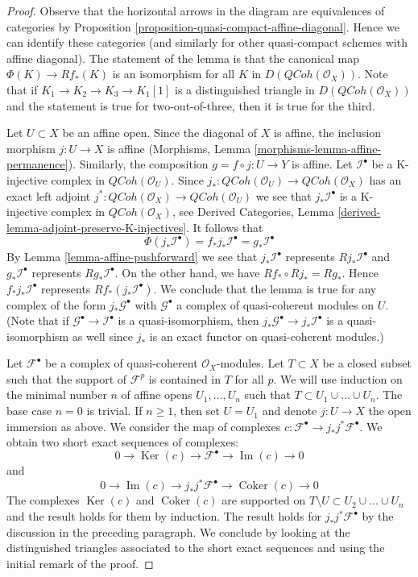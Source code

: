 \documentclass{stacks-project}
\theoremstyle{plain}
\theoremstyle{definition}
\theoremstyle{remark}
\numberwithin{equation}{subsection}
\def\QCoh{\mathit{QCoh}}
\def\Ker{\mathop{\mathrm{Ker}}}
\def\Im{\mathop{\mathrm{Im}}}
\def\Coker{\mathop{\mathrm{Coker}}}
\begin{document}
\begin{proof}
Observe that the horizontal arrows in the diagram are
equivalences of categories by
Proposition \ref{proposition-quasi-compact-affine-diagonal}.
Hence we can identify these categories (and similarly for
other quasi-compact schemes with affine diagonal).
The statement of the lemma is that the canonical map
$\Phi(K) \to Rf_*(K)$ is an isomorphism for all $K$ in
$D(\QCoh(\mathcal{O}_X))$. Note that if $K_1 \to K_2 \to K_3 \to K_1[1]$
is a distinguished triangle in $D(\QCoh(\mathcal{O}_X))$ and
the statement is true for two-out-of-three, then it is true
for the third.

\medskip\noindent
Let $U \subset X$ be an affine open. Since the diagonal of $X$ is affine,
the inclusion morphism $j : U \to X$
is affine (Morphisms, Lemma \ref{morphisms-lemma-affine-permanence}).
Similarly, the composition $g = f \circ j : U \to Y$ is affine.
Let $\mathcal{I}^\bullet$ be a K-injective complex in $\QCoh(\mathcal{O}_U)$.
Since $j_* : \QCoh(\mathcal{O}_U) \to \QCoh(\mathcal{O}_X)$
has an exact left adjoint
$j^* : \QCoh(\mathcal{O}_X) \to \QCoh(\mathcal{O}_U)$
we see that $j_*\mathcal{I}^\bullet$ is a K-injective complex
in $\QCoh(\mathcal{O}_X)$, see
Derived Categories, Lemma \ref{derived-lemma-adjoint-preserve-K-injectives}.
It follows that
$$
\Phi(j_*\mathcal{I}^\bullet) =
f_*j_*\mathcal{I}^\bullet =
g_*\mathcal{I}^\bullet
$$
By Lemma \ref{lemma-affine-pushforward} we see that
$j_*\mathcal{I}^\bullet$ represents $Rj_*\mathcal{I}^\bullet$ and
$g_*\mathcal{I}^\bullet$ represents $Rg_*\mathcal{I}^\bullet$.
On the other hand, we have $Rf_* \circ Rj_* = Rg_*$.
Hence $f_*j_*\mathcal{I}^\bullet$ represents $Rf_*(j_*\mathcal{I}^\bullet)$.
We conclude that the lemma is true for any complex
of the form $j_*\mathcal{G}^\bullet$ with $\mathcal{G}^\bullet$
a complex of quasi-coherent modules on $U$. (Note that if
$\mathcal{G}^\bullet \to \mathcal{I}^\bullet$ is a quasi-isomorphism,
then $j_*\mathcal{G}^\bullet \to j_*\mathcal{I}^\bullet$ is a
quasi-isomorphism as well since $j_*$ is an exact functor
on quasi-coherent modules.)

\medskip\noindent
Let $\mathcal{F}^\bullet$ be a complex of quasi-coherent
$\mathcal{O}_X$-modules. Let $T \subset X$ be a closed subset
such that the support of $\mathcal{F}^p$ is contained in $T$
for all $p$. We will use induction on the minimal number $n$
of affine opens $U_1, \ldots, U_n$ such that
$T \subset U_1 \cup \ldots \cup U_n$. The base case $n = 0$ is trivial.
If $n \geq 1$, then set $U = U_1$ and denote $j : U \to X$ the
open immersion as above. We consider the map of complexes
$c : \mathcal{F}^\bullet \to j_*j^*\mathcal{F}^\bullet$.
We obtain two short exact sequences of complexes:
$$
0 \to \Ker(c) \to \mathcal{F}^\bullet \to \Im(c) \to 0
$$
and
$$
0 \to \Im(c) \to j_*j^*\mathcal{F}^\bullet \to \Coker(c) \to 0
$$
The complexes $\Ker(c)$ and $\Coker(c)$ are supported
on $T \setminus U \subset U_2 \cup \ldots \cup U_n$ and the result
holds for them by induction. The result holds for
$j_*j^*\mathcal{F}^\bullet$ by the discussion in the preceding
paragraph. We conclude by looking at the distinguished triangles
associated to the short exact sequences and using the initial
remark of the proof.
\end{proof}
\end{document}
